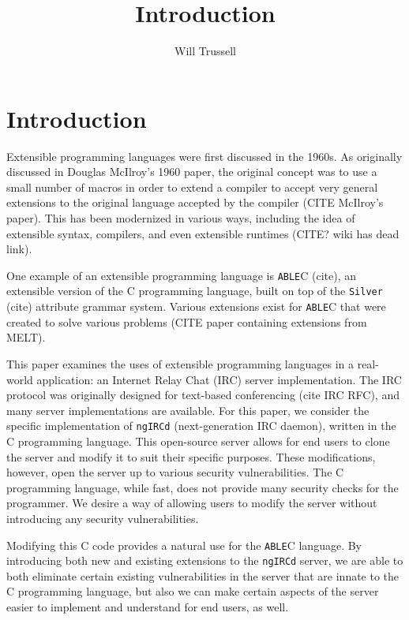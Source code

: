 \documentclass[main.tex]{subfiles}
\author{Will Trussell}
\title{Introduction}
\begin{document}
\section{Introduction}

Extensible programming languages were first discussed in the 1960s. As
originally discussed in Douglas McIlroy's 1960 paper, the original concept was
to use a small number of macros in order to extend a compiler to accept very
general extensions to the original language accepted by the compiler (CITE
McIlroy's paper). This has been modernized in various ways, including the idea
of extensible syntax, compilers, and even extensible runtimes (CITE? wiki has
dead link).

One example of an extensible programming language is \verb|ABLE|C (cite), an 
extensible version of the C programming language, built on top of the 
\verb|Silver| (cite) attribute grammar system. Various extensions exist for 
\verb|ABLE|C that were created to solve various problems (CITE paper containing
extensions from MELT). 

This paper examines the uses of extensible programming languages in a real-world
application: an Internet Relay Chat (IRC) server implementation. The IRC
protocol was originally designed for text-based conferencing (cite IRC RFC), and
many server implementations are available. For this paper, we consider the
specific implementation of \verb|ngIRCd| (next-generation IRC daemon), written 
in the C programming language. This open-source server allows for end users to 
clone the server and modify it to suit their specific purposes. These 
modifications, however, open the server up to various security vulnerabilities. 
The C programming language, while fast, does not provide many security checks 
for the programmer. We desire a way of allowing users to modify the server 
without introducing any security vulnerabilities.

Modifying this C code provides a natural use for the \verb|ABLE|C language. By
introducing both new and existing extensions to the \verb|ngIRCd| server, we are
able to both eliminate certain existing vulnerabilities in the server that are
innate to the C programming language, but also we can make certain aspects of
the server easier to implement and understand for end users, as well.
\end{document}
